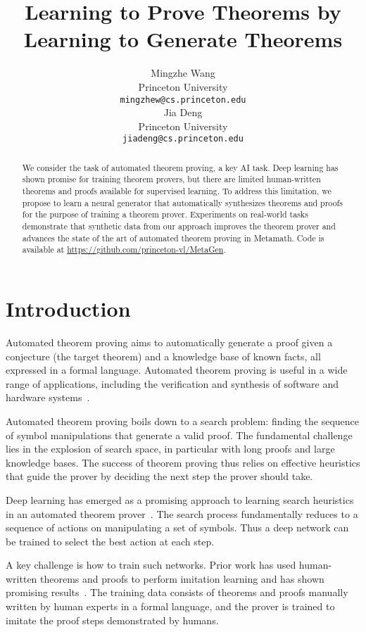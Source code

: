 \documentclass{article}
\title{Learning to Prove Theorems by Learning to Generate Theorems}
\author{Mingzhe Wang \\
  Princeton University\\
  \texttt{mingzhew@cs.princeton.edu} \\
\And
   Jia Deng \\
   Princeton University \\
   \texttt{jiadeng@cs.princeton.edu} \\
}
\begin{document}
\maketitle


\begin{abstract}
We consider the task of automated theorem proving, a key AI task. Deep learning has shown promise for training theorem provers, but there are limited human-written theorems and proofs available for supervised learning. To address this limitation, we propose to learn a neural generator that automatically synthesizes theorems and proofs for the purpose of training a theorem prover. Experiments on real-world  tasks demonstrate that synthetic data from our approach  improves the theorem prover and advances the state of the art of automated theorem proving in Metamath. Code is available at \href{https://github.com/princeton-vl/MetaGen}{https://github.com/princeton-vl/MetaGen}.
\end{abstract}

\section{Introduction}
\label{intro}

Automated theorem proving aims to automatically
generate a proof given a conjecture (the target theorem) and a knowledge base of known facts, all expressed in a formal language. 
Automated theorem proving is useful
in a wide range of applications, including the verification and synthesis of software and hardware systems~\citep{gu2016certikos,darvas2005theorem,kern1999formal}.

Automated theorem proving boils down to a search problem: finding the sequence of symbol manipulations 
that generate a valid proof. 
The fundamental challenge lies in the explosion of search space, in particular with long proofs
and large knowledge bases. The success of theorem proving thus relies on effective heuristics that guide the prover by deciding the next step the prover should take. 

Deep learning has emerged as a promising approach to learning search heuristics in an automated theorem prover~\citep{irving2016deepmath,whalen2016holophrasm,loos2017deep,bansal2019holist,lee2019mathematical}. 
The search process fundamentally reduces to a sequence of actions on manipulating a set of symbols. Thus a deep network can be
trained to select the best action at each step. 

A key challenge is how to train such networks. Prior work has used human-written theorems and proofs to perform imitation learning and has shown promising results~\citep{loos2017deep,yang2019coqgym,whalen2016holophrasm,paliwal2019graph}. The training data consists of theorems and proofs manually written by human experts in a formal language, and the prover is trained to imitate the proof steps demonstrated by humans. 
\end{document}
